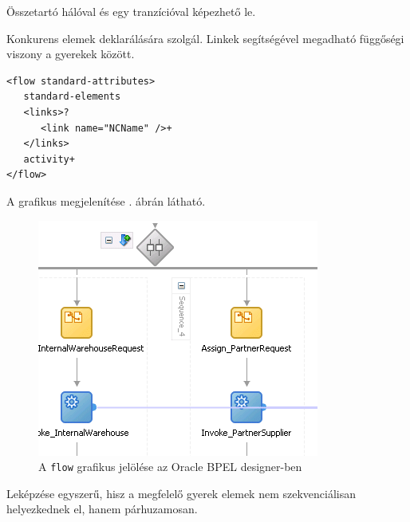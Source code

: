 Összetartó hálóval és egy tranzícióval képezhető le.



Konkurens elemek deklarálására szolgál. Linkek segítségével megadható függőségi viszony a gyerekek között. 
\begin{verbatim}
<flow standard-attributes>
   standard-elements
   <links>?
      <link name="NCName" />+
   </links>
   activity+
</flow>
\end{verbatim} 
A grafikus megjelenítése . ábrán látható.

\begin{figure}[h!]
\centering
\includegraphics[scale=1]{images/flow.png}
\caption{A \texttt{flow} grafikus jelölése az Oracle BPEL designer-ben}
\label{fig:flow}
\end{figure}
Leképzése egyszerű, hisz a megfelelő gyerek elemek nem szekvenciálisan helyezkednek el, hanem párhuzamosan.



